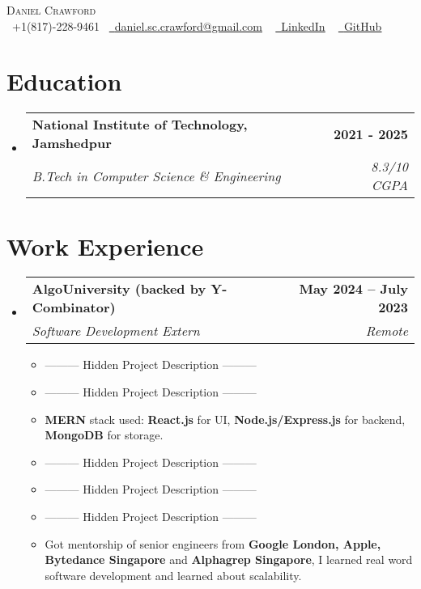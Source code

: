 \documentclass[letterpaper,11pt]{article}
\makeatletter
\newcommand{\resumeItem}[1]{
  \item\small{
    {#1 \vspace{-2pt}}
  }
}
\newcommand{\resumeSubheading}[4]{
  \vspace{-2pt}\item
    \begin{tabular*}{1.0\textwidth}[t]{l@{\extracolsep{\fill}}r}
      \textbf{#1} & \textbf{\small #2} \\
      \textit{\small#3} & \textit{\small #4} \\
    \end{tabular*}\vspace{-7pt}
}
\newcommand{\resumeSubHeadingListStart}{\begin{itemize}[leftmargin=0.0in, label={}]}
\newcommand{\resumeSubHeadingListEnd}{\end{itemize}}
\newcommand{\resumeItemListStart}{\begin{itemize}}
\newcommand{\resumeItemListEnd}{\end{itemize}\vspace{-5pt}}
\makeatother
\begin{document}
\begin{center}
  {\Huge \scshape Daniel Crawford} \\ \vspace{5pt}
  \small \raisebox{-0.1\height}\faPhone\ +1(817)-228-9461~ \href{mailto:admissions@algouniversity.com.com}{\raisebox{-0.2\height}\faEnvelope\  \underline{daniel.sc.crawford@gmail.com}} ~
  \href{https://linkedin.com/in/daniel-sc-crawford}{\raisebox{-0.2\height}\faLinkedin\ \underline{LinkedIn}}  ~
  \href{https://github.com/dscrawford}{\raisebox{-0.2\height}\faGithub\ \underline{GitHub}}
  \vspace{-8pt}
\end{center}

\vspace{-10pt}
\section{Education}
\resumeSubHeadingListStart
\resumeSubheading
{National Institute of Technology, Jamshedpur}{2021 - 2025}{B.Tech in Computer Science \& Engineering}{8.3/10 CGPA}
\resumeSubHeadingListEnd
\vspace{-15pt}



\section{Work Experience}
\resumeSubHeadingListStart

\resumeSubheading
{AlgoUniversity (backed by Y-Combinator)}{May 2024 -- July 2023}
{Software Development Extern}{Remote}
\resumeItemListStart
\resumeItem{  ---------  Hidden Project Description  ---------  }
\resumeItem{  ---------  Hidden Project Description  ---------  }

\resumeItem{\textbf{MERN} stack used: \textbf{React.js} for UI,         \textbf{Node.js/Express.js} for backend, \textbf{MongoDB} for storage.}

\resumeItem{  ---------  Hidden Project Description  ---------  }
\resumeItem{  ---------  Hidden Project Description  ---------  }

\resumeItem{  ---------  Hidden Project Description  ---------  }

\resumeItem{Got mentorship of senior engineers from \textbf{Google London, Apple, Bytedance Singapore} and \textbf{Alphagrep Singapore}, I learned real word software development and learned about scalability.}
\resumeItemListEnd
\resumeSubHeadingListEnd
\vspace{-16pt}
\end{document}
